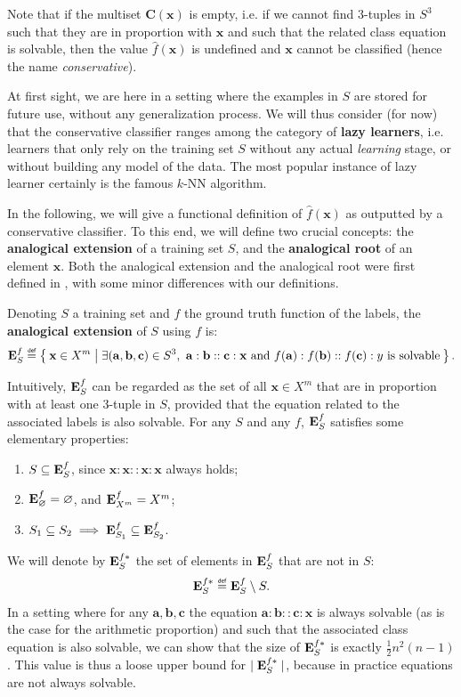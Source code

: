 Note that if the multiset $\mathbf{C}(\mathbf{x})$ is empty, i.e. if we cannot find
$3$-tuples in $S^3$ such that they are in proportion with $\mathbf{x}$ and such
that the related class equation is solvable, then the value
$\hat{f}(\mathbf{x})$  is undefined and $\mathbf{x}$ cannot be classified
(hence the name \textit{conservative}).

At first sight, we are here in a setting where the examples in $S$ are stored
for future use, without any generalization process.  We will thus consider (for
now) that the conservative classifier ranges among the category of
\textbf{lazy learners}, i.e. learners that only rely on the training set $S$
without any actual \textit{learning} stage, or without building any model of
the data. The most popular instance of lazy learner certainly is the famous
$k$-NN algorithm.

In the following, we will give a functional definition of $\hat{f}(\mathbf{x})$
as outputted by a conservative classifier. To this end, we will define two
crucial concepts: the \textbf{analogical extension} of a training set $S$, and
the \textbf{analogical root} of an element $\mathbf{x}$. Both the analogical
extension and the analogical root were first defined in \cite{StrYvoREPORT05},
with some minor differences with our definitions.

\begin{definition}
  \label{DEF:analogical_extension}
  Denoting $S$ a training set and $f$ the ground truth function of the labels,
  the \textbf{analogical extension} of $S$ using $f$ is:
  $$
  \esf \eqdef \Set{ \mathbf{x} \in X^m |  \exists
  (\mathbf{a},\mathbf{b},\mathbf{c}) \in S^3, ~ \mathbf{a} : \mathbf{b} ::
  \mathbf{c} : \mathbf{x} \text{ and } f(\mathbf{a}) : f(\mathbf{b}) ::
  f(\mathbf{c}) : y \text{ is solvable}}.
  $$
\end{definition}

Intuitively,  $\mathbf{E}_{S}^{f}$ can be regarded as the set of all $\mathbf{x} \in X^m$
that are in proportion with at least one 3-tuple in $S$, provided that the
equation related to the associated labels is also solvable. For any $S$ and any
$f$, $\mathbf{E}_{S}^{f}$ satisfies some elementary properties:
\begin{enumerate}
\item $S \subseteq \mathbf{E}_{S}^{f}$, since $\mathbf{x} : \mathbf{x} :: \mathbf{x}
  :\mathbf{x}$ always holds;
\item $\mathbf{E}_{\varnothing}^{f} = \varnothing$, and $\mathbf{E}_{X^m}^{f}=X^m$;
\item $S_1 \subseteq S_2 \implies \mathbf{E}_{S_1}^{f} \subseteq \mathbf{E}_{S_2}^{f}$.
\end{enumerate}
We will denote by $\mathbf{E}_{S}^{f*}$ the set of elements in $\mathbf{E}_{S}^{f}$ that are not in $S$:
$$\esfs \eqdef \esf \setminus S.$$ In a setting where for any
$\mathbf{a},\mathbf{b}, \mathbf{c}$ the equation $\mathbf{a} : \mathbf{b} ::
\mathbf{c} : \mathbf{x}$ is always solvable (as is the case for the arithmetic
proportion) and such that the associated class equation is also solvable, we
can show that the size of $\mathbf{E}_{S}^{f*}$ is exactly $\frac{1}{2} n^2(n - 1)$
\cite{BayMouMicAnqECML07}. This value is thus a loose upper bound for $\mid
\mathbf{E}_{S}^{f*}\mid$, because in practice
equations are not always solvable.

